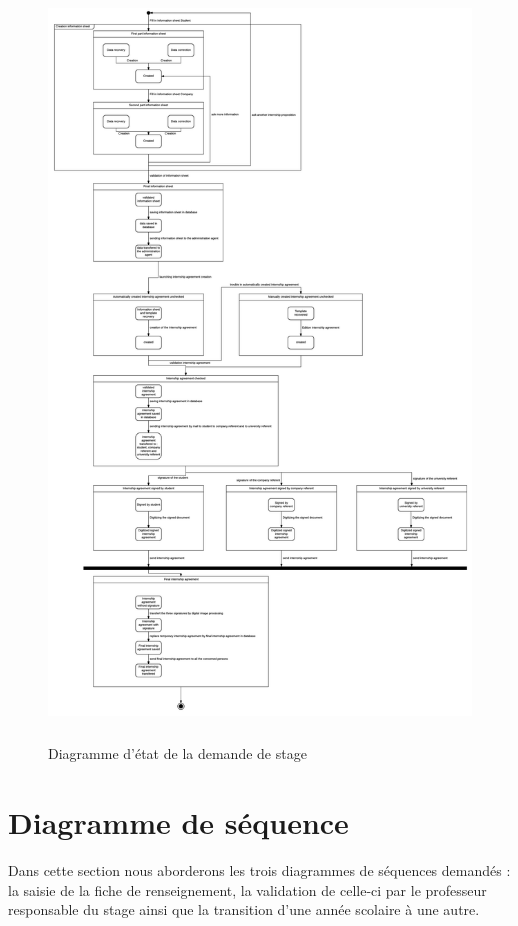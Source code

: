 \documentclass{scrreprt}
\begin{document}
\newpage
\begin{figure}[h]
\centering
\includegraphics[width=15cm, height=20cm]{images/stateDiagram.png}
\caption{Diagramme d'état de la demande de stage}
\end{figure}

\newpage
\chapter{Diagramme de séquence}

	Dans cette section nous aborderons les trois diagrammes de séquences demandés : la saisie de la fiche de renseignement,
la validation de celle-ci par le professeur responsable du stage ainsi que la transition d'une année scolaire à une autre.
\end{document}
